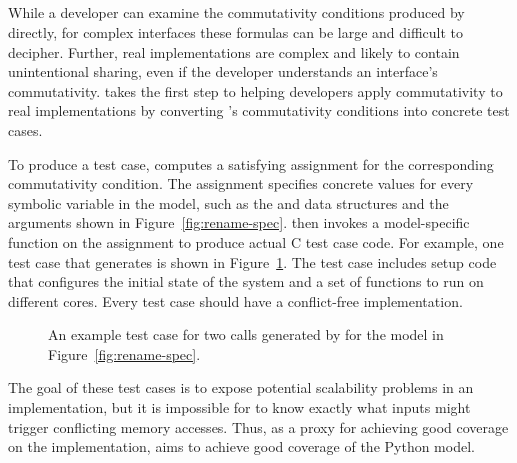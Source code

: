 \subsection{\generator{}}
\label{sec:model:generator}

While a developer can examine the commutativity conditions
produced by \analyzer directly, for complex interfaces these formulas
can be large and difficult to decipher.  Further, real implementations
are complex and likely to contain unintentional sharing, even if the
developer understands an interface's commutativity.  \generator takes
the first step to helping developers apply commutativity to real
implementations by converting \analyzer's commutativity conditions into
concrete test cases.

To produce a test case, \generator computes
a satisfying assignment for the corresponding commutativity condition.
The assignment specifies concrete values for every symbolic variable in
the model, such as the  and  data structures
and the  arguments shown in Figure~\ref{fig:rename-spec}.
\generator then invokes a model-specific function on the assignment
to produce actual C test case code.  For example, one test
case that \generator{} generates is shown in Figure~\ref{fig:testgen}.
The test case includes setup code that configures the initial state of
the system and a set of functions to run on different cores. Every
\generator test case should have a conflict-free implementation.

\begin{figure}
\begin{small}

\end{small}
\caption{An example test case for two  calls generated by
         \generator{} for the model in Figure~\ref{fig:rename-spec}.}
\label{fig:testgen}
\end{figure}

The goal of these test cases is to expose potential scalability problems
in an implementation, but it is impossible for \generator{} to know
exactly what inputs might trigger conflicting memory accesses.  Thus, as a
proxy for achieving good coverage on the implementation, \generator{}
aims to achieve good coverage of the Python model.

